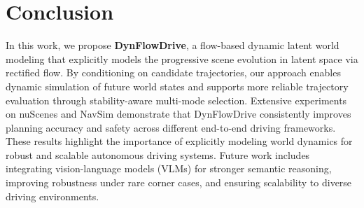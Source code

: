 \section{Conclusion}
In this work, we propose \textbf{DynFlowDrive}, a flow-based dynamic latent world modeling that explicitly models the progressive scene evolution in latent space via rectified flow. By conditioning on candidate trajectories, our approach enables dynamic simulation of future world states and supports more reliable trajectory evaluation through stability-aware multi-mode selection.
Extensive experiments on nuScenes and NavSim demonstrate that DynFlowDrive consistently improves planning accuracy and safety across different end-to-end driving frameworks. These results highlight the importance of explicitly modeling world dynamics for robust and scalable autonomous driving systems. 
Future work includes integrating vision-language models (VLMs) for stronger semantic reasoning, improving robustness under rare corner cases, and ensuring scalability to diverse driving environments.
